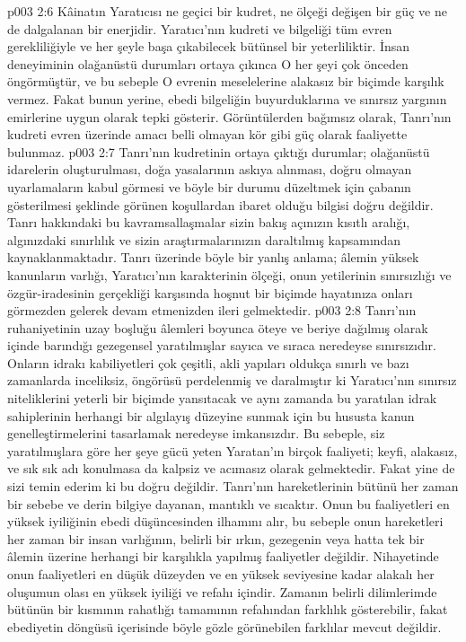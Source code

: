 \vs p003 2:6 Kâinatın Yaratıcısı ne geçici bir kudret, ne ölçeği değişen bir güç ve ne de dalgalanan bir enerjidir. Yaratıcı’nın kudreti ve bilgeliği tüm evren gerekliliğiyle ve her şeyle başa çıkabilecek bütünsel bir yeterliliktir. İnsan deneyiminin olağanüstü durumları ortaya çıkınca O her şeyi çok önceden öngörmüştür, ve bu sebeple O evrenin meselelerine alakasız bir biçimde karşılık vermez. Fakat bunun yerine, ebedi bilgeliğin buyurduklarına ve sınırsız yargının emirlerine uygun olarak tepki gösterir. Görüntülerden bağımsız olarak, Tanrı’nın kudreti evren üzerinde amacı belli olmayan kör gibi güç olarak faaliyette bulunmaz.
\vs p003 2:7 Tanrı’nın kudretinin ortaya çıktığı durumlar; olağanüstü idarelerin oluşturulması, doğa yasalarının askıya alınması, doğru olmayan uyarlamaların kabul görmesi ve böyle bir durumu düzeltmek için çabanın gösterilmesi şeklinde görünen koşullardan ibaret olduğu bilgisi doğru değildir. Tanrı hakkındaki bu kavramsallaşmalar sizin bakış açınızın kısıtlı aralığı, algınızdaki sınırlılık ve sizin araştırmalarınızın daraltılmış kapsamından kaynaklanmaktadır. Tanrı üzerinde böyle bir yanlış anlama; âlemin yüksek kanunların varlığı, Yaratıcı’nın karakterinin ölçeği, onun yetilerinin sınırsızlığı ve özgür\hyp{}iradesinin gerçekliği karşısında hoşnut bir biçimde hayatınıza onları görmezden gelerek devam etmenizden ileri gelmektedir.
\vs p003 2:8 Tanrı’nın ruhaniyetinin uzay boşluğu âlemleri boyunca öteye ve beriye dağılmış olarak içinde barındığı gezegensel yaratılmışlar sayıca ve sıraca neredeyse sınırsızıdır. Onların idrakı kabiliyetleri çok çeşitli, akli yapıları oldukça sınırlı ve bazı zamanlarda inceliksiz, öngörüsü perdelenmiş ve daralmıştır ki Yaratıcı’nın sınırsız niteliklerini yeterli bir biçimde yansıtacak ve aynı zamanda bu yaratılan idrak sahiplerinin herhangi bir algılayış düzeyine sunmak için bu hususta kanun genelleştirmelerini tasarlamak neredeyse imkansızdır. Bu sebeple, siz yaratılmışlara göre her şeye gücü yeten Yaratan’ın birçok faaliyeti; keyfi, alakasız, ve sık sık adı konulmasa da kalpsiz ve acımasız olarak gelmektedir. Fakat yine de sizi temin ederim ki bu doğru değildir. Tanrı’nın hareketlerinin bütünü her zaman bir sebebe ve derin bilgiye dayanan, mantıklı ve sıcaktır. Onun bu faaliyetleri en yüksek iyiliğinin ebedi düşüncesinden ilhamını alır, bu sebeple onun hareketleri her zaman bir insan varlığının, belirli bir ırkın, gezegenin veya hatta tek bir âlemin üzerine herhangi bir karşılıkla yapılmış faaliyetler değildir. Nihayetinde onun faaliyetleri en düşük düzeyden ve en yüksek seviyesine kadar alakalı her oluşumun olası en yüksek iyiliği ve refahı içindir. Zamanın belirli dilimlerimde bütünün bir kısmının rahatlığı tamamının refahından farklılık gösterebilir, fakat ebediyetin döngüsü içerisinde böyle gözle görünebilen farklılar mevcut değildir.

